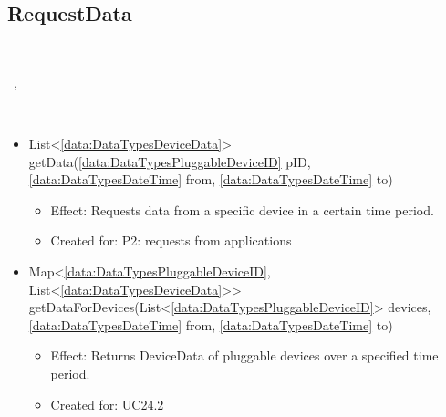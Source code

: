   \subsection{RequestData}\label{int:OnlineServiceOnlineServiceDeviceDataSchedulerRequestData}
    \begin{description}
      \item[Provided by:] \iconcomponent{}~
      \item[Required by:] \iconcomponent{}~, \iconcomponent{}~
      \item[Operations:] ~
    \begin{itemize}[noitemsep,nolistsep,leftmargin=-.25cm]
      \item \textsf{List\textless{}\ref{data:DataTypesDeviceData}\textgreater{} getData(\ref{data:DataTypesPluggableDeviceID} pID, \ref{data:DataTypesDateTime} from, \ref{data:DataTypesDateTime} to)}
        \begin{itemize}[noitemsep,nolistsep]
           \item Effect: Requests data from a specific device in a certain time period.
\item Created for: P2: requests from applications
        \end{itemize}
      \item \textsf{Map\textless{}\ref{data:DataTypesPluggableDeviceID}, List\textless{}\ref{data:DataTypesDeviceData}\textgreater{}\textgreater{} getDataForDevices(List\textless{}\ref{data:DataTypesPluggableDeviceID}\textgreater{} devices, \ref{data:DataTypesDateTime} from, \ref{data:DataTypesDateTime} to)}
        \begin{itemize}[noitemsep,nolistsep]
           \item Effect: Returns DeviceData of pluggable devices over a specified time period.
\item Created for: UC24.2
        \end{itemize}
    \end{itemize}
    \end{description}

